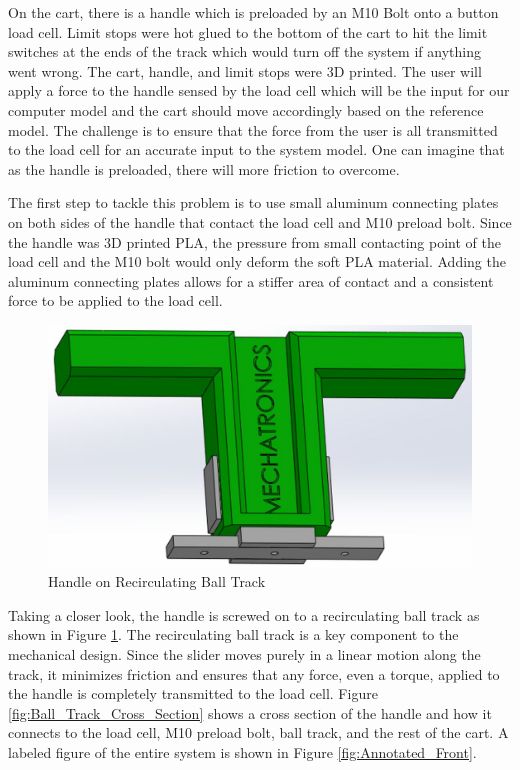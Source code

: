 On the cart, there is a handle which is preloaded by an M10 Bolt onto a button load cell. Limit stops were hot glued to the bottom of the cart to hit the limit switches at the ends of the track which would turn off the system if anything went wrong. The cart, handle, and limit stops were 3D printed. The user will apply a force to the handle sensed by the load cell which will be the input for our computer model and the cart should move accordingly based on the reference model. The challenge is to ensure that the force from the user is all transmitted to the load cell for an accurate input to the system model. One can imagine that as the handle is preloaded, there will more friction to overcome.

The first step to tackle this problem is to use small aluminum connecting plates on both sides of the handle that contact the load cell and M10 preload bolt. Since the handle was 3D printed PLA, the pressure from small contacting point of the load cell and the M10 bolt would only deform the soft PLA material. Adding the aluminum connecting plates allows for a stiffer area of contact and a consistent force to be applied to the load cell.

\begin{figure}[H]
	\centering
	\includegraphics[width=1\columnwidth]{Images/Recirculating_Ball_Track}
	\caption{Handle on Recirculating Ball Track}
	\label{fig:Recirculating_Ball_Track}
\end{figure}

Taking a closer look, the handle is screwed on to a recirculating ball track as shown in Figure \ref{fig:Recirculating_Ball_Track}. The recirculating ball track is a key component to the mechanical design. Since the slider moves purely in a linear motion along the track, it minimizes friction and ensures that any force, even a torque, applied to the handle is completely transmitted to the load cell. Figure \ref{fig:Ball_Track_Cross_Section} shows a cross section of the handle and how it connects to the load cell, M10 preload bolt, ball track, and the rest of the cart. A labeled figure of the entire system is shown in Figure \ref{fig:Annotated_Front}.

